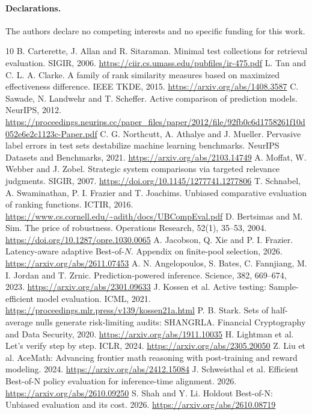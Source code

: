 \documentclass[11pt]{article}
\begin{document}
\paragraph{Declarations.} The authors declare no competing interests and no specific funding for this work.
\begin{thebibliography}{10}
 B. Carterette, J. Allan and R. Sitaraman. Minimal test collections for retrieval evaluation. SIGIR, 2006. \url{https://ciir.cs.umass.edu/pubfiles/ir-475.pdf}
 L. Tan and C. L. A. Clarke. A family of rank similarity measures based on maximized effectiveness difference. IEEE TKDE, 2015. \url{https://arxiv.org/abs/1408.3587}
 C. Sawade, N. Landwehr and T. Scheffer. Active comparison of prediction models. NeurIPS, 2012. \url{https://proceedings.neurips.cc/paper_files/paper/2012/file/92fb0c6d1758261f10d052e6e2c1123c-Paper.pdf}
 C. G. Northcutt, A. Athalye and J. Mueller. Pervasive label errors in test sets destabilize machine learning benchmarks. NeurIPS Datasets and Benchmarks, 2021. \url{https://arxiv.org/abs/2103.14749}
 A. Moffat, W. Webber and J. Zobel. Strategic system comparisons via targeted relevance judgments. SIGIR, 2007. \url{https://doi.org/10.1145/1277741.1277806}
 T. Schnabel, A. Swaminathan, P. I. Frazier and T. Joachims. Unbiased comparative evaluation of ranking functions. ICTIR, 2016. \url{https://www.cs.cornell.edu/~adith/docs/UBCompEval.pdf}
 D. Bertsimas and M. Sim. The price of robustness. Operations Research, 52(1), 35--53, 2004. \url{https://doi.org/10.1287/opre.1030.0065}
 A. Jacobson, Q. Xie and P. I. Frazier. Latency-aware adaptive Best-of-$N$. Appendix on finite-pool selection, 2026. \url{https://arxiv.org/abs/2611.07453}
 A. N. Angelopoulos, S. Bates, C. Fannjiang, M. I. Jordan and T. Zrnic. Prediction-powered inference. Science, 382, 669--674, 2023. \url{https://arxiv.org/abs/2301.09633}
 J. Kossen et al. Active testing: Sample-efficient model evaluation. ICML, 2021. \url{https://proceedings.mlr.press/v139/kossen21a.html}
 P. B. Stark. Sets of half-average nulls generate risk-limiting audits: SHANGRLA. Financial Cryptography and Data Security, 2020. \url{https://arxiv.org/abs/1911.10035}
 H. Lightman et al. Let's verify step by step. ICLR, 2024. \url{https://arxiv.org/abs/2305.20050}
 Z. Liu et al. AceMath: Advancing frontier math reasoning with post-training and reward modeling. 2024. \url{https://arxiv.org/abs/2412.15084}
 J. Schweisthal et al. Efficient Best-of-N policy evaluation for inference-time alignment. 2026. \url{https://arxiv.org/abs/2610.09250}
 S. Shah and Y. Li. Holdout Best-of-N: Unbiased evaluation and its cost. 2026. \url{https://arxiv.org/abs/2610.08719}
\end{thebibliography}
\end{document}
